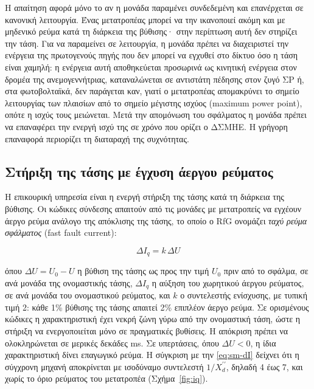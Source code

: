 Η απαίτηση αφορά μόνο το αν η μονάδα παραμένει συνδεδεμένη και επανέρχεται σε κανονική
λειτουργία. Ένας μετατροπέας μπορεί να την ικανοποιεί ακόμη και με μηδενικό ρεύμα κατά τη
διάρκεια της βύθισης· στην
περίπτωση αυτή δεν στηρίζει την τάση. Για να παραμείνει σε λειτουργία, η μονάδα πρέπει να
διαχειριστεί την ενέργεια της πρωτογενούς πηγής που δεν μπορεί να εγχυθεί στο δίκτυο όσο η
τάση είναι χαμηλή: η ενέργεια αυτή αποθηκεύεται προσωρινά ως κινητική ενέργεια στον δρομέα της
ανεμογεννήτριας, καταναλώνεται σε αντιστάτη πέδησης στον ζυγό ΣΡ ή, στα φωτοβολταϊκά, δεν
παράγεται καν, γιατί ο μετατροπέας απομακρύνει το σημείο λειτουργίας των πλαισίων από το σημείο
μέγιστης ισχύος (maximum power point), οπότε η ισχύς τους μειώνεται. Μετά την απομόνωση του
σφάλματος η μονάδα πρέπει να επαναφέρει την ενεργή ισχύ της σε χρόνο που ορίζει ο ΔΣΜΗΕ. Η
γρήγορη επαναφορά περιορίζει τη διαταραχή της συχνότητας.

\subsection{Στήριξη της τάσης με έγχυση άεργου ρεύματος}
\label{sec:kfactor}

Η επικουρική υπηρεσία είναι η ενεργή στήριξη της τάσης κατά τη διάρκεια της βύθισης. Οι
κώδικες σύνδεσης απαιτούν από τις μονάδες με μετατροπείς να εγχέουν άεργο ρεύμα ανάλογο της
απόκλισης της τάσης, το οποίο ο RfG ονομάζει \emph{ταχύ ρεύμα σφάλματος} (fast fault current):

\begin{equation}
\Delta I_q = k\,\Delta U
\label{eq:kfactor}
\end{equation}

όπου $\Delta U = U_0 - U$ η βύθιση της τάσης ως προς την τιμή $U_0$ πριν από το σφάλμα, σε ανά
μονάδα της ονομαστικής τάσης, $\Delta I_q$ η αύξηση του χωρητικού άεργου ρεύματος, σε ανά
μονάδα του ονομαστικού ρεύματος, και $k$ ο συντελεστής ενίσχυσης, με τυπική τιμή 2: κάθε 1\%
βύθισης της τάσης απαιτεί 2\% επιπλέον άεργο ρεύμα. Σε ορισμένους κώδικες η χαρακτηριστική
έχει νεκρή ζώνη γύρω από την ονομαστική τάση, ώστε η στήριξη να ενεργοποιείται μόνο σε
πραγματικές βυθίσεις. Η απόκριση πρέπει να ολοκληρώνεται σε μερικές δεκάδες ms. Σε υπερτάσεις,
όπου $\Delta U < 0$, η ίδια χαρακτηριστική δίνει επαγωγικό ρεύμα. Η σύγκριση με την
\eqref{eq:sm-dI} δείχνει ότι η σύγχρονη μηχανή αποκρίνεται με ισοδύναμο συντελεστή
$1/X_d^{\prime\prime}$, δηλαδή 4 έως 7, και χωρίς το όριο ρεύματος του μετατροπέα
(Σχήμα~\ref{fig:iq}).


